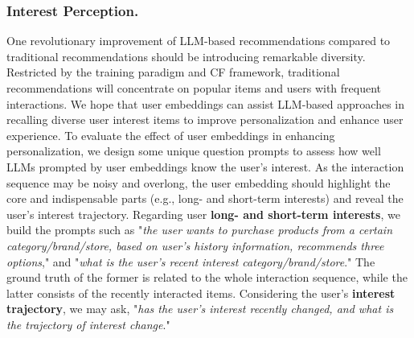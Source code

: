 
\subsubsection{\textbf{Interest Perception.}}
One revolutionary improvement of LLM-based recommendations compared to traditional recommendations should be introducing remarkable diversity. Restricted by the training paradigm and CF framework, traditional recommendations will concentrate on popular items and users with frequent interactions. We hope that user embeddings can assist LLM-based approaches in recalling diverse user interest items to improve personalization and enhance user experience. 
To evaluate the effect of user embeddings in enhancing personalization, we design some unique question prompts to assess how well LLMs prompted by user embeddings know the user's interest. 
As the interaction sequence may be noisy and overlong, the user embedding should highlight the core and indispensable parts (e.g., long- and short-term interests) and reveal the user's interest trajectory. 
Regarding user \textbf{long- and short-term interests}, we build the prompts such as "\textit{the user wants to purchase products from a certain category/brand/store, based on user's history information, recommends three options}," and "\textit{what is the user's recent interest category/brand/store}." The ground truth of the former is related to the whole interaction sequence, while the latter consists of the recently interacted items.  
Considering the user's \textbf{interest trajectory}, we may ask, "\textit{has the user's interest recently changed, and what is the trajectory of interest change}." 

